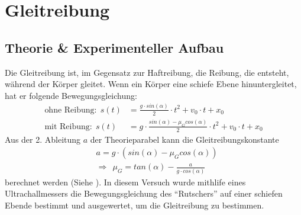 \documentclass[11pt, a4paper]{article}
\begin{document}
    \section{Gleitreibung}

    \subsection{Theorie \& Experimenteller Aufbau}

    Die Gleitreibung ist, im Gegensatz zur Haftreibung, die Reibung, die entsteht, während der Körper gleitet.
    Wenn ein Körper eine schiefe Ebene hinuntergleitet, hat er folgende Bewegungsgleichung:
    \begin{align}
        \text{ohne Reibung:} \ \  s(t) &= \frac{g \cdot sin(\alpha)}{2} \cdot t^2 +v_0 \cdot t + x_0 \\
        \text{mit Reibung:} \ \  s(t) &= g \cdot \frac{sin(\alpha) -\mu_G cos(\alpha)}{2} \cdot t^2 +v_0 \cdot t + x_0
    \end{align}
    Aus der 2. Ableitung $a$ der Theorieparabel kann die Gleitreibungskonstante
    \begin{align}
        &a = g \cdot (sin(\alpha) - \mu_G cos(\alpha)) \\
        &\Rightarrow \ \ \mu_G = tan(\alpha) - \frac{a}{g \cdot cos(\alpha)}
    \end{align} 
    berechnet werden (Siehe \cite[(7)]{SEB}).
    In diesem Versuch wurde mithlife eines Ultrachallmessers die Bewegungsgleichung des ``Rutschers'' auf
    einer schiefen Ebende bestimmt und ausgewertet, um die Gleitreibung zu bestimmen.
\end{document}

